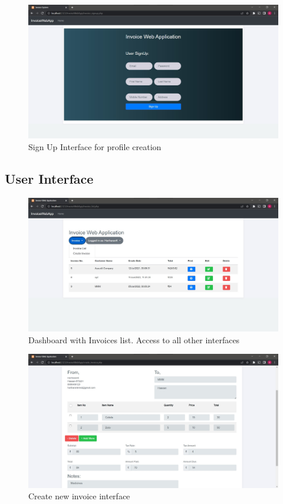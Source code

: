\begin{figure}[h]\centering
	\includegraphics[width=6in]{./images/signup.jpg}
	\caption{Sign Up Interface for profile creation}\label{signup}
\end{figure}

\pagebreak

\subsection{User Interface}
\begin{figure}[h]\centering
	\includegraphics[width=6in]{./images/dashboard.jpg}
	\caption{Dashboard with Invoices list. Access to all other interfaces}\label{dashboard}
\end{figure}

\begin{figure}[h]\centering
	\includegraphics[width=6in]{./images/createInvoice.jpg}
	\caption{Create new invoice interface}\label{createInvoice}
\end{figure}

